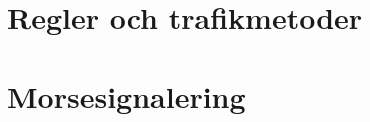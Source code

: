 \chapter{Regler och trafikmetoder}
% 
%
\chapter{Morsesignalering}
% 
%
\appendix
%
%
%
%
%
%
%
%
%
%
%
%
%
%
